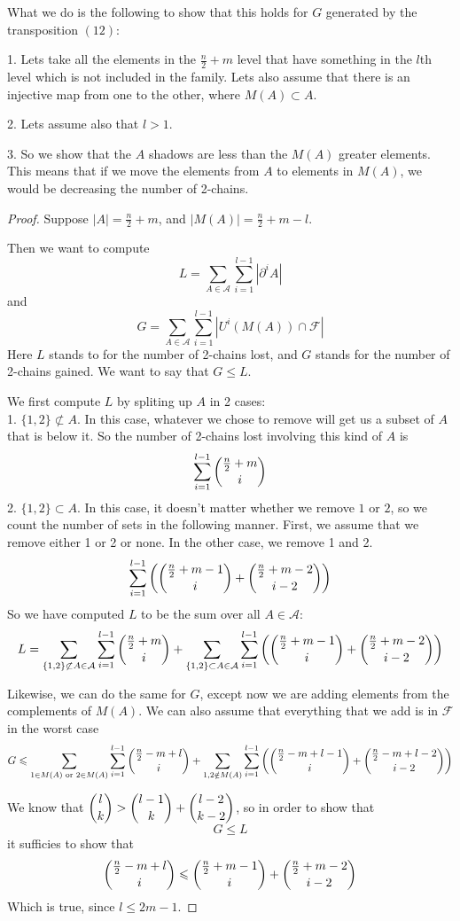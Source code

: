 \documentclass[12pt]{article}
\theoremstyle{plain}
\theoremstyle{definition}
\theoremstyle{remark}
\newcommand{\F}{\mathcal{F}}
\newcommand{\A}{\mathcal{A}}
\begin{document}
What we do is the following to show that this holds for $G$ generated by the transposition $(12)$:

1. Lets take all the elements in the $\frac{n}{2} + m$ level that have something in the $l$th level which is not included in the family. Lets also assume that there is an injective map from one to the other, where $M(A) \subset A$. 

2. Lets assume also that $l > 1$. 

3. So we show that the $A$ shadows are less than the $M(A)$ greater elements. This means that if we move the elements from $A$ to elements in $M(A)$, we would be decreasing the number of 2-chains. 

\begin{proof}
Suppose $|A| = \frac{n}{2} + m$, and $|M(A)| = \frac{n}{2} + m - l$.

Then we want to compute
\[L = \sum_{A \in \A} \sum_{i=1}^{l-1} |\partial^iA| \]
and 
\[G = \sum_{A \in \A} \sum_{i=1}^{l-1} |U^i(M(A)) \cap \F| \]
Here $L$ stands to for the number of 2-chains lost, and $G$ stands for the number of 2-chains gained. We want to say that $G \leq L$. 

We first compute $L$ by spliting up $A$ in 2 cases:\\
1. $\{ 1, 2 \} \not\subset A$. In this case, whatever we chose to remove will get us a subset of $A$ that is below it. So the number of 2-chains lost involving this kind of $A$ is
\[ \sum_{i=1}^{l-1} \dbinom{\frac{n}{2} + m}{i} \]
2. $\{ 1, 2 \} \subset A$. In this case, it doesn't matter whether we remove $1$ or $2$, so we count the number of sets in the following manner. First, we assume that we remove either 1 or 2 or none. In the other case, we remove 1 and 2.
\[ \sum_{i=1}^{l-1} \left(\dbinom{\frac{n}{2} + m - 1}{i} + \dbinom{\frac{n}{2}+m-2}{i-2} \right) \]
So we have computed $L$ to be the sum over all $A \in \A$:
\[ L = \sum_{\{1, 2\} \not\subset A \in \A} \sum_{i=1}^{l-1} \dbinom{\frac{n}{2} + m}{i} + \sum_{\{1, 2\} \subset A \in \A} \sum_{i=1}^{l-1} \left( \dbinom{\frac{n}{2}+m-1}{i} + \dbinom{\frac{n}{2}+m-2}{i-2}\right) \]

Likewise, we can do the same for $G$, except now we are adding elements from the complements of $M(A)$. We can also assume that everything that we add is in $\F$ in the worst case
\[ G \leq \sum_{1 \in M(A) \text{ or } 2 \in M(A)} \sum_{i=1}^{l-1} \dbinom{\frac{n}{2}-m+l}{i} + \sum_{1, 2 \notin M(A)} \sum_{i=1}^{l-1} \left( \dbinom{\frac{n}{2}-m+l-1}{i} + \dbinom{\frac{n}{2}-m+l-2}{i-2} \right) \]

We know that $\dbinom{l}{k} > \dbinom{l-1}{k} + \dbinom{l-2}{k-2}$, so in order to show that 
\[ G \leq L \]
it sufficies to show that
\[ \dbinom{\frac{n}{2}-m+l}{i} \leq \dbinom{\frac{n}{2}+m-1}{i} + \dbinom{\frac{n}{2}+m-2}{i-2} \]
Which is true, since $l \leq 2m-1$.
\end{proof}
\end{document}
